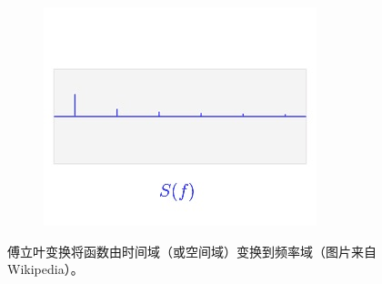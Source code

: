 \documentclass[10pt,fancyhdr,graybox, envcountchap,oribibl,twoside]{svmono}
\begin{document}
\begin{figure}
\begin{fullwidth}
\begin{subfigure}[b]{0.33\textwidth}
		\includegraphics[width=1.\textwidth]{figures/intro/fourier-3}
	\end{subfigure}
\caption{傅立叶变换将函数由时间域（或空间域）变换到频率域（图片来自Wikipedia）。}
\label{f:intro-fourier}
\end{fullwidth}
\end{figure}
\end{document}
